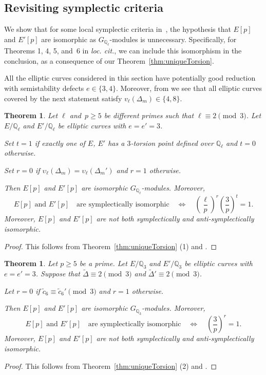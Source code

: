 \documentclass[12pt]{amsart}
\numberwithin{equation}{section}
\newtheorem{theorem}[equation]{Theorem}
\theoremstyle{definition}
\newcommand{\Q}{\mathbb{Q}}
\begin{document}
\subsection{Revisiting symplectic criteria}
\label{sec:revisiting}
We show that for some local symplectic criteria in~\cite{symplectic}, the hypothesis that $E[p]$ and $E'[p]$ are isomorphic as $G_{\Q_\ell}$-modules is unnecessary. Specifically, 
for Theorems 1, 4, 5, and~6 in {\it loc. cit.}, we can include this isomorphism in the conclusion, as a consequence of our Theorem~\ref{thm:uniqueTorsion}. 

All the elliptic curves considered in this section have potentially good reduction with semistability 
defects $e \in \{3,4\}$. Moreover, from \cite[Table 5]{symplectic} we see that all elliptic curves covered by the next statement 
satisfy $v_\ell(\Delta_m) \in \{4,8\}$.   

\begin{theorem} Let $\ell$ and~$p \geq 5$ be different primes such that $\ell \equiv 2 \pmod{3}$.
Let $E/\Q_\ell$ and $E'/\Q_\ell$ be elliptic curves with $e=e'=3$.

Set $t=1$ if exactly one of $E$, $E'$ has a $3$-torsion point defined over $\Q_\ell$ and $t=0$ otherwise.

Set $r=0$ if $\upsilon_\ell(\Delta_m) = \upsilon_\ell(\Delta_m')$ and $r=1$ otherwise.

Then $E[p]$ and $E'[p]$ are isomorphic $G_{\Q_{\ell}}$-modules.
Moreover,
\[
 E[p] \text{ and } E'[p] \quad \text{are symplectically isomorphic} \quad \Leftrightarrow \quad \left(\frac{\ell}{p}\right)^r \left (\frac{3}{p} \right)^t = 1.
\]
\label{T:mainTame3}
Moreover, $E[p]$ and $E'
[p]$ are not both symplectically and anti-symplectically isomorphic.
\end{theorem}
\begin{proof} This follows from Theorem~\ref{thm:uniqueTorsion} (1) 
and \cite[Theorem 1]{symplectic}. 
\end{proof}

\begin{theorem} Let $p \geq 5$ be a prime.
Let $E/\Q_3$ and $E'/\Q_3$ be elliptic curves
with $e=e'=3$.
Suppose that $\tilde{\Delta} \equiv 2 \pmod{3}$ and $\tilde{\Delta}' \equiv 2 \pmod{3}$.

Let $r=0$ if $\tilde{c}_6 \equiv \tilde{c}_6' \pmod{3}$ and $r=1$ otherwise.

Then $E[p]$ and $E'[p]$ are isomorphic $G_{\Q_3}$-modules.
Moreover,
\[
 E[p] \text{ and } E'[p] \quad \text{are symplectically isomorphic} \quad \Leftrightarrow \quad \left (\frac{3}{p} \right)^r = 1.
\]
\label{T:mainWild3}
Moreover, $E[p]$ and $E'
[p]$ are not both symplectically and anti-symplectically isomorphic.
\end{theorem}
\begin{proof} This follows from Theorem~\ref{thm:uniqueTorsion} (2) 
and \cite[Theorem 4]{symplectic}. 
\end{proof}
\end{document}

